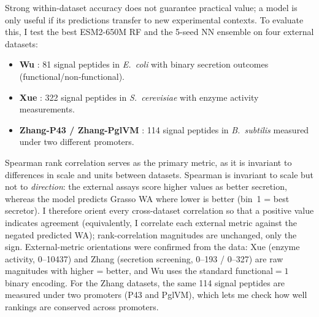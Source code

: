 \documentclass[12pt]{article}
\begin{document}
Strong within-dataset accuracy does not guarantee practical value; a model is only useful if its predictions transfer to new experimental contexts.
To evaluate this, I test the best ESM2-650M RF and the 5-seed NN ensemble on four external datasets:
\begin{itemize}
    \item \textbf{Wu} \citep{wu2020}: 81 signal peptides in \textit{E.\ coli} with binary secretion outcomes (functional/non-functional).
    \item \textbf{Xue} \citep{xue2023}: 322 signal peptides in \textit{S.\ cerevisiae} with enzyme activity measurements.
    \item \textbf{Zhang-P43 / Zhang-PglVM} \citep{zhang2016}: 114 signal peptides in \textit{B.\ subtilis} measured under two different promoters.
\end{itemize}
Spearman rank correlation serves as the primary metric, as it is invariant to differences in scale and units between datasets. Spearman is invariant to scale but not to \emph{direction}: the external assays score higher values as better secretion, whereas the model predicts Grasso WA where lower is better (bin~1 = best secretor). I therefore orient every cross-dataset correlation so that a positive value indicates agreement (equivalently, I correlate each external metric against the negated predicted WA); rank-correlation magnitudes are unchanged, only the sign. External-metric orientations were confirmed from the data: Xue (enzyme activity, 0--10437) and Zhang (secretion screening, 0--193 / 0--327) are raw magnitudes with higher = better, and Wu uses the standard functional${=}1$ binary encoding.
For the Zhang datasets, the same 114 signal peptides are measured under two promoters (P43 and PglVM), which lets me check how well rankings are conserved across promoters.
\end{document}
